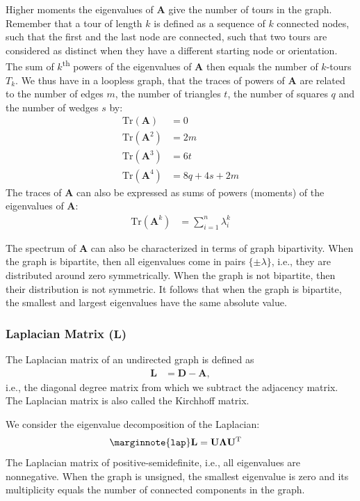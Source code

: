 \documentclass{article}
\begin{document}
Higher moments the eigenvalues of $\mathbf A$ give the number of tours
in the graph.  Remember that a tour of length $k$ is defined as a
sequence of $k$ connected nodes, such that the first and the last node
are connected, such that two tours are considered as distinct when they
have a different starting node or orientation. 
The sum of $k$\textsuperscript{th} powers of the
eigenvalues of $\mathbf A$ then equals the number of $k$-tours $T_k$. 
We thus have in a loopless graph, that the traces of powers of $\mathbf
A$ are related to the number of edges $m$, the number of triangles $t$,
the number of squares $q$ and the number of wedges $s$ by:
\begin{align*}
  \mathrm{Tr}(\mathbf A) &= 0 \\
  \mathrm{Tr}(\mathbf A^2) &= 2m \\
  \mathrm{Tr}(\mathbf A^3) &= 6t \\
  \mathrm{Tr}(\mathbf A^4) &= 8q + 4s + 2m
\end{align*}
The traces of $\mathbf A$ can also be expressed as sums of powers
(moments) of the eigenvalues of $\mathbf A$:
\begin{align*}
  \mathrm{Tr}(\mathbf A^k) &= \sum_{i=1}^n \lambda_i^k
\end{align*}

The spectrum of $\mathbf A$ can also be characterized in terms of graph
bipartivity.  When the graph is bipartite, then all eigenvalues come in
pairs $\{\pm\lambda\}$, i.e., they are distributed around zero
symmetrically.  When the graph is not bipartite, then their distribution
is not symmetric.  It follows that when the graph is bipartite, the
smallest and largest eigenvalues have the same absolute value. 

\subsubsection{Laplacian Matrix ($\mathbf L$)}
The Laplacian matrix of an undirected graph is defined as
\begin{align*}
  \mathbf L &= \mathbf D - \mathbf A,
\end{align*}
i.e., the diagonal degree matrix from which we subtract the adjacency
matrix.  The Laplacian matrix is also called the Kirchhoff matrix. 

We consider the eigenvalue decomposition of the Laplacian:
\begin{align*}
  \marginnote{\texttt{lap}}
  \mathbf L &= \mathbf U \mathbf \Lambda \mathbf U^{\mathrm T}
\end{align*}
The Laplacian matrix of positive-semidefinite, i.e., all eigenvalues are
nonnegative.  
When the graph is unsigned, the smallest eigenvalue is zero and its
multiplicity equals the number of connected components in the graph. 
\end{document}
